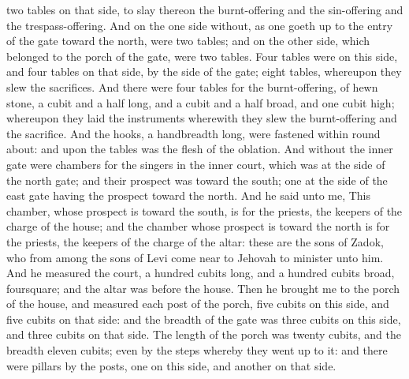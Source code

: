 two tables on that side, to slay thereon the burnt-offering and the sin-offering and the trespass-offering. And on the one side without, as one goeth up to the entry of the gate toward the north, were two tables; and on the other side, which belonged to the porch of the gate, were two tables. Four tables were on this side, and four tables on that side, by the side of the gate; eight tables, whereupon they slew the sacrifices. And there were four tables for the burnt-offering, of hewn stone, a cubit and a half long, and a cubit and a half broad, and one cubit high; whereupon they laid the instruments wherewith they slew the burnt-offering and the sacrifice. And the hooks, a handbreadth long, were fastened within round about: and upon the tables was the flesh of the oblation.  And without the inner gate were chambers for the singers in the inner court, which was at the side of the north gate; and their prospect was toward the south; one at the side of the east gate having the prospect toward the north. And he said unto me, This chamber, whose prospect is toward the south, is for the priests, the keepers of the charge of the house; and the chamber whose prospect is toward the north is for the priests, the keepers of the charge of the altar: these are the sons of Zadok, who from among the sons of Levi come near to Jehovah to minister unto him. And he measured the court, a hundred cubits long, and a hundred cubits broad, foursquare; and the altar was before the house.  Then he brought me to the porch of the house, and measured each post of the porch, five cubits on this side, and five cubits on that side: and the breadth of the gate was three cubits on this side, and three cubits on that side. The length of the porch was twenty cubits, and the breadth eleven cubits; even by the steps whereby they went up to it: and there were pillars by the posts, one on this side, and another on that side. 

